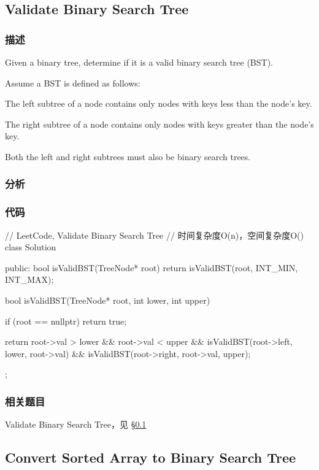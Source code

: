 \subsection{Validate Binary Search Tree}
\label{sec:validate-binary-search-tree}


\subsubsection{描述}
Given a binary tree, determine if it is a valid binary search tree (BST).

Assume a BST is defined as follows:
\begindot
\item The left subtree of a node contains only nodes with keys less than the node's key.
\item The right subtree of a node contains only nodes with keys greater than the node's key.
\item Both the left and right subtrees must also be binary search trees.
\myenddot


\subsubsection{分析}


\subsubsection{代码}

\begin{Code}
// LeetCode, Validate Binary Search Tree
// 时间复杂度O(n)，空间复杂度O(\logn)
class Solution {
public:
    bool isValidBST(TreeNode* root) {
        return isValidBST(root, INT_MIN, INT_MAX);
    }

    bool isValidBST(TreeNode* root, int lower, int upper) {
        if (root == nullptr) return true;

        return root->val > lower && root->val < upper
                && isValidBST(root->left, lower, root->val)
                && isValidBST(root->right, root->val, upper);
    }
};
\end{Code}


\subsubsection{相关题目}
\begindot
\item Validate Binary Search Tree，见 \S \ref{sec:validate-binary-search-tree}
\myenddot


\subsection{Convert Sorted Array to Binary Search Tree}
\label{sec:convert-sorted-array-to-binary-search-tree}


